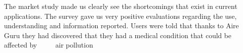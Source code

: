 \begin{itemize}
    \done The market study made us clearly see the shortcomings that exist in current applications.
    \done The survey gave us very positive evaluations regarding the use, understanding and information reported.
    \done Users were told that thanks to Aire Guru they had discovered that they had a medical condition that could be affected by
         air pollution

\end{itemize}
 

\newpage